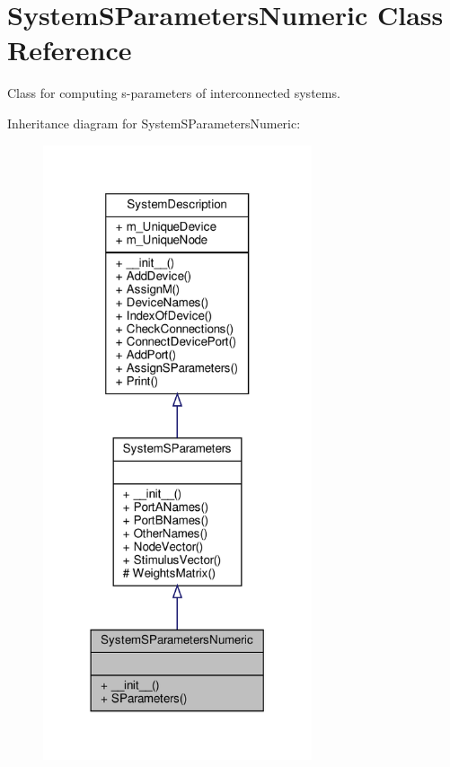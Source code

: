 \hypertarget{classSignalIntegrity_1_1SystemDescriptions_1_1SystemSParametersNumeric_1_1SystemSParametersNumeric}{}\section{System\+S\+Parameters\+Numeric Class Reference}
\label{classSignalIntegrity_1_1SystemDescriptions_1_1SystemSParametersNumeric_1_1SystemSParametersNumeric}


Class for computing s-\/parameters of interconnected systems.  




Inheritance diagram for System\+S\+Parameters\+Numeric\+:
\nopagebreak
\begin{figure}[H]
\begin{center}
\leavevmode
\includegraphics[width=224pt]{classSignalIntegrity_1_1SystemDescriptions_1_1SystemSParametersNumeric_1_1SystemSParametersNumeric__inherit__graph}
\end{center}
\end{figure}


